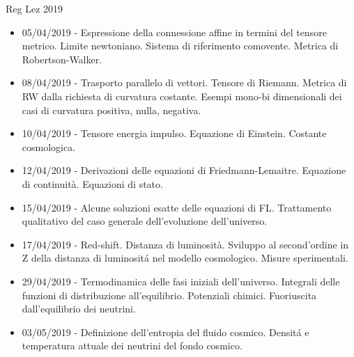 \begin{frame}[allowframebreaks]{Reg Lez 2019}
\begin{itemize}
\item 05/04/2019 - Espressione della connessione affine in termini del tensore metrico. Limite newtoniano. Sistema di riferimento comovente. Metrica di Robertson-Walker.
\item 08/04/2019 - Trasporto parallelo di vettori. Tensore di Riemann. Metrica di RW dalla richiesta di curvatura costante. Esempi mono-bi dimensionali dei casi di curvatura positiva, nulla, negativa.
\item 10/04/2019 - Tensore energia impulso. Equazione di Einstein. Costante cosmologica.
\item 12/04/2019 - Derivazioni delle equazioni di Friedmann-Lemaitre. Equazione di continuità. Equazioni di stato.
\item 15/04/2019 - Alcune soluzioni esatte delle equazioni di FL. Trattamento qualitativo del caso generale dell'evoluzione dell'universo.
\item 17/04/2019 - Red-shift. Distanza di luminosità. Sviluppo al second'ordine in Z della distanza di luminosit\'a nel modello cosmologico. Misure sperimentali.
\item 29/04/2019 - Termodinamica delle fasi iniziali dell'universo. Integrali delle funzioni di distribuzione all'equilibrio. Potenziali chimici. Fuoriuscita dall'equilibrio dei neutrini.
\item 03/05/2019 - Definizione dell'entropia del fluido cosmico. Densit\'a e temperatura attuale dei neutrini del fondo cosmico.
\end{itemize}

\end{frame}